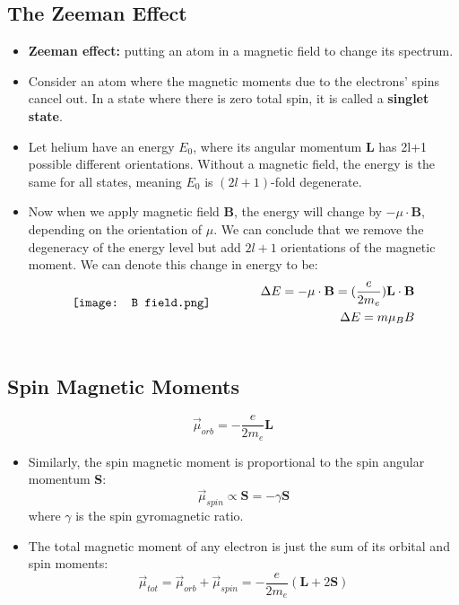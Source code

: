 \documentclass[12pt, letterpaper, twoside]{article}
\begin{document}
\subsection{The Zeeman Effect}

\begin{itemize}
    \item \textbf{Zeeman effect:} putting an atom in a magnetic field to change its spectrum.
    \item Consider an atom where the magnetic moments due to the electrons' spins cancel out. In a state where there is zero total spin, it is called a \textbf{singlet state}.
    \item Let helium have an energy $E_0$, where its angular momentum $\textbf{L}$ has 2l+1 possible different orientations. Without a magnetic field, the energy is the same for all states, meaning $E_0$ is $(2l+1)$-fold degenerate.
    \item Now when we apply magnetic field \textbf{B}, the energy will change by $-\mu \cdot \mathbf{B}$, depending on the orientation of $\mu$. We can conclude that we remove the degeneracy of the energy level but add $2l+1$ orientations of the magnetic moment. We can denote this change in energy to be:
    \begin{align}
    \vcenter{\hbox{\texttt{[image: B field.png]}}}
        &\qquad\qquad
        \begin{aligned}
            \Delta E = -\mu\cdot \textbf{B} = (\frac{e}{2m_e})\textbf{L}\cdot\textbf{B}\\
            \Delta E = m\mu_B B
        \end{aligned}\\
        \vcenter{\hbox{\begin{minipage}{8cm}
        \end{minipage}}}
        & \notag
    \end{align}
\end{itemize}

\subsection{Spin Magnetic Moments}

\begin{equation*}
    \vec{\mu}_{orb} = -\frac{e}{2m_e}\textbf{L}
\end{equation*}
\begin{itemize}
    \item Similarly, the spin magnetic moment is proportional to the spin angular momentum \textbf{S}:
    \begin{equation*}
        \vec{\mu}_{spin} \propto \textbf{S} = -\gamma\textbf{S}
    \end{equation*}
    where $\gamma$ is the spin gyromagnetic ratio.
    \item The total magnetic moment of any electron is just the sum of its orbital and spin moments:
    \begin{equation*}
        \vec{\mu}_{tot} = \vec{\mu}_{orb} + \vec{\mu}_{spin} = -\frac{e}{2m_e}(\textbf{L} + 2\textbf{S})
    \end{equation*}
\end{itemize}
\end{document}
